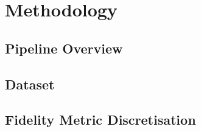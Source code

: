 \documentclass[../main.tex]{subfiles}
\begin{document}
\chapter{Methodology}
\label{ch:methodology}


\section{Pipeline Overview}
\label{sec:method-overview}

\section{Dataset}
\label{sec:method-dataset}

\section{Fidelity Metric Discretisation}
\label{sec:method-fidelity}
\end{document}

